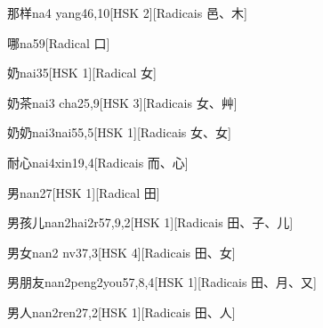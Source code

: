\begin{entry}{那样}{na4 yang4}{6,10}[HSK 2][Radicais ⾢、⽊]
\end{entry}

\begin{entry}{哪}{na5}{9}[Radical ⼝]
\end{entry}

\begin{entry}{奶}{nai3}{5}[HSK 1][Radical ⼥]
\end{entry}

\begin{entry}{奶茶}{nai3 cha2}{5,9}[HSK 3][Radicais ⼥、⾋]
\end{entry}

\begin{entry}{奶奶}{nai3nai5}{5,5}[HSK 1][Radicais ⼥、⼥]
\end{entry}

\begin{entry}{耐心}{nai4xin1}{9,4}[Radicais ⽽、⼼]
\end{entry}

\begin{entry}{男}{nan2}{7}[HSK 1][Radical ⽥]
\end{entry}

\begin{entry}{男孩儿}{nan2hai2r5}{7,9,2}[HSK 1][Radicais ⽥、⼦、⼉]
\end{entry}

\begin{entry}{男女}{nan2 nv3}{7,3}[HSK 4][Radicais ⽥、⼥]
\end{entry}

\begin{entry}{男朋友}{nan2peng2you5}{7,8,4}[HSK 1][Radicais ⽥、⽉、⼜]
\end{entry}

\begin{entry}{男人}{nan2ren2}{7,2}[HSK 1][Radicais ⽥、⼈]
\end{entry}

